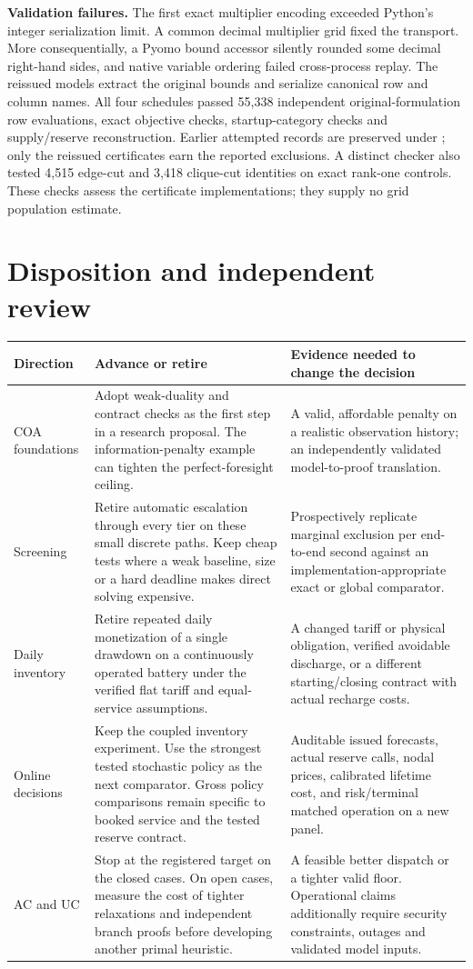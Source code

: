 \documentclass[10pt,letterpaper]{article}
\begin{document}
\textbf{Validation failures.} The first exact multiplier encoding exceeded Python's integer serialization limit. A common decimal multiplier grid fixed the transport. More consequentially, a Pyomo bound accessor silently rounded some decimal right-hand sides, and native variable ordering failed cross-process replay. The reissued models extract the original bounds and serialize canonical row and column names. All four schedules passed 55,338 independent original-formulation row evaluations, exact objective checks, startup-category checks and supply/reserve reconstruction. Earlier attempted records are preserved under ; only the reissued certificates earn the reported exclusions. A distinct checker also tested 4,515 edge-cut and 3,418 clique-cut identities on exact rank-one controls. These checks assess the certificate implementations; they supply no grid population estimate.
\section{Disposition and independent review}
\begin{tabularx}{\linewidth}{@{}p{.16\linewidth}Xp{.29\linewidth}@{}}
\toprule
Direction & Advance or retire & Evidence needed to change the decision\\\midrule
COA foundations & Adopt weak-duality and contract checks as the first step in a research proposal. The information-penalty example can tighten the perfect-foresight ceiling. & A valid, affordable penalty on a realistic observation history; an independently validated model-to-proof translation.\\
Screening & Retire automatic escalation through every tier on these small discrete paths. Keep cheap tests where a weak baseline, size or a hard deadline makes direct solving expensive. & Prospectively replicate marginal exclusion per end-to-end second against an implementation-appropriate exact or global comparator.\\
Daily inventory & Retire repeated daily monetization of a single drawdown on a continuously operated battery under the verified flat tariff and equal-service assumptions. & A changed tariff or physical obligation, verified avoidable discharge, or a different starting/closing contract with actual recharge costs.\\
Online decisions & Keep the coupled inventory experiment. Use the strongest tested stochastic policy as the next comparator. Gross policy comparisons remain specific to booked service and the tested reserve contract. & Auditable issued forecasts, actual reserve calls, nodal prices, calibrated lifetime cost, and risk/terminal matched operation on a new panel.\\
AC and UC & Stop at the registered target on the closed cases. On open cases, measure the cost of tighter relaxations and independent branch proofs before developing another primal heuristic. & A feasible better dispatch or a tighter valid floor. Operational claims additionally require security constraints, outages and validated model inputs.\\\bottomrule
\end{tabularx}
\end{document}
